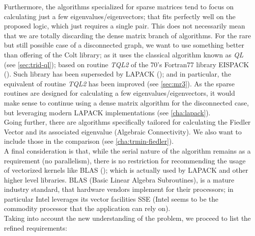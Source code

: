 Furthermore, the algorithms specialized for sparse matrices tend to
focus on calculating just a few eigenvalues/eigenvectors; that fits
perfectly well on the proposed logic, which just requires a single
pair. This does not necessarily mean that we are totally discarding
the dense matrix branch of algorithms. For the rare but still possible
case of a disconnected graph, we want to use something better than
offering of the Colt library; as it uses the classical
algorithm known as \emph{QL} (see \cref{sec:trid-ql}); based on routine
\emph{TQL2} of the
70's Fortran77 library EISPACK (\cite{eispack}). Such library has been
superseded by LAPACK (\cite{lapack}); and in particular, the
equivalent of routine \emph{TQL2} has been improved (see
\cref{sec:mr3}). As the sparse routines are designed for calculating a
few eigenvalues/eigenvectors, it would make sense to continue using a
dense matrix algorithm for the disconnected case, but leveraging
modern LAPACK implementations (see \cref{cha:lapack}). \\

Going further, there are algorithms specifically tailored for
calculating the Fiedler Vector and its associated eigenvalue
(Algebraic Connectivity). We also want to include those in the
comparison (see \cref{cha:trmin-fiedler}). \\

A final consideration is that, while the serial nature of the
algorithm remains as a requirement (no parallelism), there is no
restriction for recommending the usage of vectorized kernels like BLAS
(\cite{blas}); which is actually used by LAPACK and other higher level
libraries. BLAS (Basic Linear Algebra Subroutines), is a mature
industry standard, that hardware vendors implement for their
processors; in particular Intel leverages its vector facilities SSE
(Intel seems to be the commodity processor that the application can
rely on). \\

Taking into account the new understanding of the problem, we proceed
to list the refined requirements: \\

